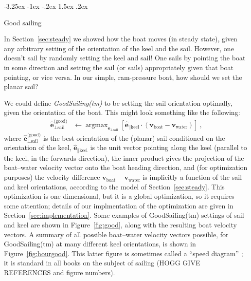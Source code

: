 \documentclass[letterpaper]{article}
\makeatletter
\DeclareMathOperator*{\argmax}{argmax}
\renewcommand{\vec}[1]{\boldsymbol{#1}}
\newcommand{\uvec}{\vec{\hat{e}}}
\newcommand{\water}{\text{water}}
\newcommand{\boat}{\text{boat}}
\newcommand{\good}{\text{(good)}}
\newcommand{\sail}{\text{sail}}
\newcommand{\keel}{\text{keel}}
\newcommand{\vwater}{\vec{v}_\water}
\newcommand{\vboat}{\vec{v}_\boat}
\newcommand{\secref}[1]{Section~\ref{#1}}
\newcommand{\figref}[1]{Figure~\ref{#1}}
\renewcommand\section{\@startsection {section}{1}{\z@}%
  {-3.25ex \@plus -1ex \@minus -.2ex}%
  {1.5ex \@plus .2ex}%
  {\raggedright\normalfont\large\bfseries}}
\makeatother
\begin{document}
\section{Good sailing}\label{sec:good}

In \secref{sec:steady} we showed how the boat moves (in steady state), given any arbitrary setting of the orientation of the keel and the sail.
However, one doesn't sail by randomly setting the keel and sail!
One sails by pointing the boat in some direction and setting the sail (or sails) appropriately given that boat pointing, or vice versa.
In our simple, ram-pressure boat, how should we set the planar sail?

We could define \emph{GoodSailing(tm)} to be setting the sail orientation optimally, given the orientation of the boat.
This might look something like the following:
\begin{align}\label{eq:good}
    \uvec_{\perp\sail}^\good &\leftarrow \argmax_{\uvec_{\perp\sail}} \left[\uvec_{\parallel\keel}\cdot(\vboat-\vwater)\right] ~,
\end{align}
where $\uvec_{\perp\sail}^\good$ is the best orientation of the (planar) sail conditioned on the orientation of the keel,
$\uvec_{\parallel\keel}$ is the unit vector pointing along the keel (parallel to the keel, in the forwards direction),
the inner product gives the projection of the boat--water velocity vector onto the boat heading direction,
and (for optimization purposes) the velocity difference $\vboat-\vwater$ is implicitly a function of the sail and keel orientations, according to the model of \secref{sec:steady}.
This optimization is one-dimensional, but it is a global optimization, so it requires some attention; details of our implmentation of the optimization are given in \secref{sec:implementation}.
Some examples of GoodSailing(tm) settings of sail and keel are shown in \figref{fig:good}, along with the resulting boat velocity vectors.
A summary of all possible boat--water velocity vectors possible, for GoodSailing(tm) at many different keel orientations, is shown in \figref{fig:hourgood}.
This latter figure is sometimes called a ``speed diagram'' \cite{pos}; it is standard in all books on the subject of sailing (HOGG GIVE REFERENCES and figure numbers).
\end{document}
